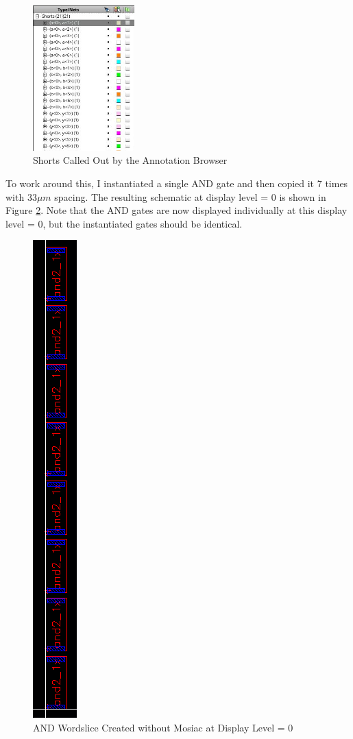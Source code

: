 \documentclass{article}
\begin{document}
	\begin{figure}[H]
		\centerline{\includegraphics[width=0.35\textwidth]{and2_1x_8_annotation_shorts.png}}
		\caption{Shorts Called Out by the Annotation Browser}
		\label{fig::and2_1x_8_annotation_shorts}
	\end{figure}
	
	\noindent To work around this, I instantiated a single AND gate and then copied it 7 times with $33{\mu}m$ spacing. The resulting schematic at display level = 0 is shown in Figure \ref{fig::and2_1x_8_layout_overview}. Note that the AND gates are now displayed individually at this display level = 0, but the instantiated gates should be identical.
	
	\begin{figure}[H]
		\centerline{\includegraphics[height=0.8\textwidth, angle=270]{and2_1x_8_layout_overview.png}}
		\caption{AND Wordslice Created without Mosiac at Display Level = 0}
		\label{fig::and2_1x_8_layout_overview}
	\end{figure}
	
\end{document}
